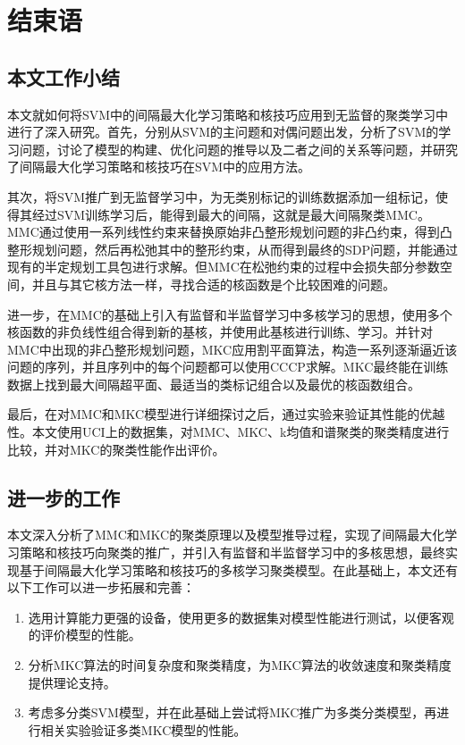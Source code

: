 \chapter{结束语}
\section{本文工作小结}
本文就如何将SVM中的间隔最大化学习策略和核技巧应用到无监督的聚类学习中进行了深入研究。首先，分别从SVM的主问题和对偶问题出发，分析了SVM的学习问题，讨论了模型的构建、优化问题的推导以及二者之间的关系等问题，并研究了间隔最大化学习策略和核技巧在SVM中的应用方法。

其次，将SVM推广到无监督学习中，为无类别标记的训练数据添加一组标记，使得其经过SVM训练学习后，能得到最大的间隔，这就是最大间隔聚类MMC。MMC通过使用一系列线性约束来替换原始非凸整形规划问题的非凸约束，得到凸整形规划问题，然后再松弛其中的整形约束，从而得到最终的SDP问题，并能通过现有的半定规划工具包进行求解。但MMC在松弛约束的过程中会损失部分参数空间，并且与其它核方法一样，寻找合适的核函数是个比较困难的问题。

进一步，在MMC的基础上引入有监督和半监督学习中多核学习的思想，使用多个核函数的非负线性组合得到新的基核，并使用此基核进行训练、学习。并针对MMC中出现的非凸整形规划问题，MKC应用割平面算法，构造一系列逐渐逼近该问题的序列，并且序列中的每个问题都可以使用CCCP求解。MKC最终能在训练数据上找到最大间隔超平面、最适当的类标记组合以及最优的核函数组合。

最后，在对MMC和MKC模型进行详细探讨之后，通过实验来验证其性能的优越性。本文使用UCI上的数据集，对MMC、MKC、k均值和谱聚类的聚类精度进行比较，并对MKC的聚类性能作出评价。

\section{进一步的工作}
本文深入分析了MMC和MKC的聚类原理以及模型推导过程，实现了间隔最大化学习策略和核技巧向聚类的推广，并引入有监督和半监督学习中的多核思想，最终实现基于间隔最大化学习策略和核技巧的多核学习聚类模型。在此基础上，本文还有以下工作可以进一步拓展和完善：
\begin{enumerate}[fullwidth,itemindent=24pt]
  \item 选用计算能力更强的设备，使用更多的数据集对模型性能进行测试，以便客观的评价模型的性能。
  \item 分析MKC算法的时间复杂度和聚类精度，为MKC算法的收敛速度和聚类精度提供理论支持。
  \item 考虑多分类SVM模型，并在此基础上尝试将MKC推广为多类分类模型，再进行相关实验验证多类MKC模型的性能。
\end{enumerate}